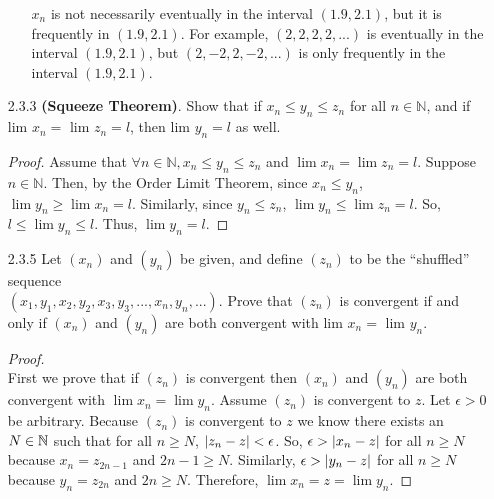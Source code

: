 \documentclass[12pt,letterpaper]{article}
\begin{document}
\begin{itemize}[leftmargin=!,labelindent=5pt]
\begin{itemize}
            $x_n$ is not necessarily eventually in the interval $(1.9, 2.1)$, but it is frequently in $(1.9, 2.1)$. 
            For example, $(2,2,2,2,...)$ is eventually in the interval $(1.9, 2.1)$, but $(2,-2,2,-2,...)$ is only frequently in the interval $(1.9, 2.1)$.
        \end{itemize}
    \item [2.3.3] \textbf{(Squeeze Theorem)}. Show that if $x_n \leq y_n \leq z_n$ for all $n \in \mathbb{N}$, and if lim $x_n =$ lim $z_n = l$, then lim $y_n = l$ as well.
        \begin{proof}
            Assume that $\forall n \in \mathbb{N}, x_n \leq y_n \leq z_n$ and $\lim x_n = \lim z_n = l$.
            Suppose $n \in \mathbb{N}$.
            Then, by the Order Limit Theorem, since $x_n \leq y_n$, $\lim y_n \geq \lim x_n = l$.
            Similarly, since $y_n \leq z_n$, $\lim y_n \leq \lim z_n = l$.
            So, $l \leq \lim y_n \leq l$.
            Thus, $\lim y_n = l$.
        \end{proof}
    \item [2.3.5] Let $(x_n)$ and $(y_n)$ be given, and define $(z_n)$ to be the “shuffled” sequence \\$(x_1, y_1, x_2, y_2, x_3, y_3, . . . , x_n, y_n, . . . )$. Prove that $(z_n)$ is convergent if and only if $(x_n)$ and $(y_n)$ are both convergent with lim $x_n =$ lim $y_n$.
        \begin{proof}
            \ \\
            First we prove that if $(z_n)$ is convergent then $(x_n)$ and $(y_n)$ are both convergent with $\lim x_n = \lim y_n$.
            Assume $(z_n)$ is convergent to $z$.
            Let $\epsilon > 0$ be arbitrary.
            Because $(z_n)$ is convergent to $z$ we know there exists an $N \in \mathbb{N}$ such that for all $n \geq N$, $\abs{z_n - z} < \epsilon$.
            So, $\epsilon > \abs{x_n-z}$ for all $n \geq N$ because $x_n = z_{2n-1}$ and $2n-1 \geq N$.
            Similarly, $\epsilon > \abs{y_n-z}$ for all $n \geq N$ because $y_n = z_{2n}$ and $2n \geq N$.
            Therefore, $\lim x_n = z = \lim y_n$.


\end{proof}
\end{itemize}
\end{document}

